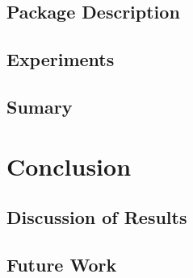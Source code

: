 \documentclass[conference]{IEEEtran}
\begin{document}
\subsection{Package Description} 

\subsection{Experiments} 

\subsection{Sumary}

\section{Conclusion}
	
\subsection{Discussion of Results} 

\subsection{Future Work} 




\enlargethispage{-5.1in}

\end{document}
